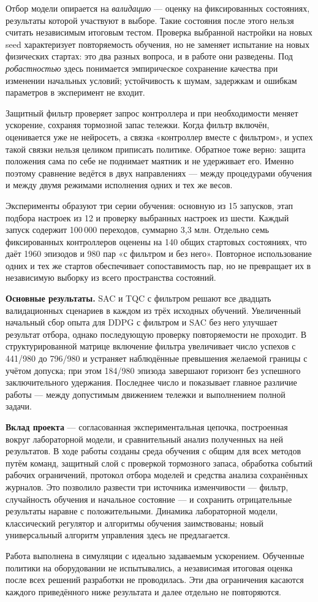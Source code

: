 Отбор модели опирается на \emph{валидацию} — оценку на фиксированных состояниях, результаты которой участвуют в выборе. Такие состояния после этого нельзя считать независимым итоговым тестом. Проверка выбранной настройки на новых seed характеризует повторяемость обучения, но не заменяет испытание на новых физических стартах: это два разных вопроса, и в работе они разведены. Под \emph{робастностью} здесь понимается эмпирическое сохранение качества при изменении начальных условий; устойчивость к шумам, задержкам и ошибкам параметров в эксперимент не входит.

Защитный фильтр проверяет запрос контроллера и при необходимости меняет ускорение, сохраняя тормозной запас тележки. Когда фильтр включён, оценивается уже не нейросеть, а связка «контроллер вместе с фильтром», и успех такой связки нельзя целиком приписать политике. Обратное тоже верно: защита положения сама по себе не поднимает маятник и не удерживает его. Именно поэтому сравнение ведётся в двух направлениях — между процедурами обучения и между двумя режимами исполнения одних и тех же весов.

Эксперименты образуют три серии обучения: основную из 15 запусков, этап подбора настроек из 12 и проверку выбранных настроек из шести. Каждый запуск содержит 100\,000 переходов, суммарно 3,3 млн. Отдельно семь фиксированных контроллеров оценены на 140 общих стартовых состояниях, что даёт 1960 эпизодов и 980 пар «с фильтром и без него». Повторное использование одних и тех же стартов обеспечивает сопоставимость пар, но не превращает их в независимую выборку из всего пространства состояний.

\textbf{Основные результаты.} SAC и TQC с фильтром решают все двадцать валидационных сценариев в каждом из трёх исходных обучений. Увеличенный начальный сбор опыта для DDPG с фильтром и SAC без него улучшает результат отбора, однако последующую проверку повторяемости не проходит. В структурированной матрице включение фильтра увеличивает число успехов с 441/980 до 796/980 и устраняет наблюдённые превышения желаемой границы с учётом допуска; при этом 184/980 эпизода завершают горизонт без успешного заключительного удержания. Последнее число и показывает главное различие работы — между допустимым движением тележки и выполнением полной задачи.

\textbf{Вклад проекта} — согласованная экспериментальная цепочка, построенная вокруг лабораторной модели, и сравнительный анализ полученных на ней результатов. В ходе работы созданы среда обучения с общим для всех методов путём команд, защитный слой с проверкой тормозного запаса, обработка событий рабочих ограничений, протокол отбора моделей и средства анализа сохранённых журналов. Это позволило развести три источника изменчивости — фильтр, случайность обучения и начальное состояние — и сохранить отрицательные результаты наравне с положительными. Динамика лабораторной модели, классический регулятор и алгоритмы обучения заимствованы; новый универсальный алгоритм управления здесь не предлагается.

Работа выполнена в симуляции с идеально задаваемым ускорением. Обученные политики на оборудовании не испытывались, а независимая итоговая оценка после всех решений разработки не проводилась. Эти два ограничения касаются каждого приведённого ниже результата и далее отдельно не повторяются.

